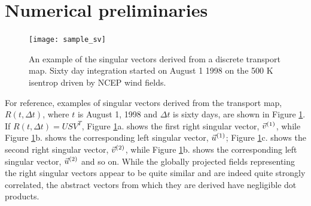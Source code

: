 \section{Numerical preliminaries}

\begin{figure}
  \texttt{[image: sample\_sv]}
  \caption{An example of the singular vectors derived from a discrete transport map.
  Sixty day integration started on August 1 1998 on the 500 K isentrop driven by NCEP wind fields.}
  \label{sample_SV}
\end{figure}

For reference, examples of singular vectors derived from the transport map,
$R(t, \Delta t)$, where $t$ is August 1, 1998 and $\Delta t$ is sixty days,
are shown in Figure \ref{sample_SV}.
If $R(t, \Delta t)=U S V^T$,
Figure \ref{sample_SV}a. shows the first right singular vector, $\vec v^{(1)}$,
while Figure \ref{sample_SV}b. shows the corresponding left singular vector,
$\vec u^{(1)}$;
Figure \ref{sample_SV}c. shows the second right singular vector, $\vec v^{(2)}$,
while Figure \ref{sample_SV}b. shows the corresponding left singular vector,
$\vec u^{(2)}$
and so on.
While the globally projected fields representing the right singular vectors 
appear to be quite similar and are indeed
quite strongly correlated, the abstract vectors from which they are derived
have negligible dot products.

